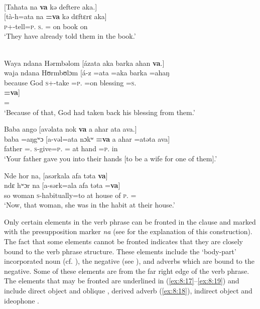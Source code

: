 \ea \label{ex:8:13}\\
{}[Tahata  na \textbf{va}  kə  deftere  aka.]\\
\gll  {}[tà-h=ata    na  \textbf{=va}    kə  dɛftɛrɛ  aka]\\
      \textsc{p}+{\PFV}-tell=\textsc{p}.{\IO}  \textsc{s}.{\DO}  ={\PRF}    on  book  on\\
\glt  ‘They have already told them in the book.’ 
\z


\ea \label{ex:8:14}\\
Waya  ndana  Hərmbəlom  [ázata  aka  {barka  ahan} \textbf{va}.]\\
\gll  waja  ndana  Hʊrmbʊlɔm   [á-z  =ata   =aka   {barka}    {=ahaŋ}\\     
      because    {\DEM}   God             \textsc{s}+{\IFV}-take =\textsc{p}.{\IO} =on   blessing    =\textsc{s}.{\POSS}\\  
      
    \medskip
\gll \textbf{=va}]\\    
     ={\PRF}\\
\glt  ‘Because of that, God had taken back his blessing from them.’
\z

\ea \label{ex:8:15}
Baba  ango  [avəlata  {nok} \textbf{va}  {a  ahar  ata  ava}.]\\
\gll  baba  =aŋgʷɔ  [a-vəl=ata    {nɔkʷ}  \textbf{=va} {a}  {ahar} {=atəta}  {ava}]\\
      father  ={\twoS}.{\POSS}  \textsc{s}-give=\textsc{p}.{\IO}    {\twoS}  ={\PRF}  at  hand  =\textsc{p}.{\POSS}  in\\
\glt  ‘Your father gave you into their hands [to be a wife for one of them].’
\z

\ea \label{ex:8:16}
Nde  hor  na,  [asərkala  {afa  təta}  \textbf{va}]\\
\gll  ndɛ    hʷɔr  na      [a-sərk=ala  {afa}           {təta}     =\textbf{va}]\\
      so    woman  {\PSP}    \textsc{s}-habitually=to   {at house of}  \textsc{p}.{\POSS}   ={\PRF}\\
\glt  ‘Now, that woman, she was in the habit at their house.’ 
\z

Only certain elements in the verb phrase can be fronted in the clause and marked with the presupposition marker \textit{na} (see  for the explanation of this construction). The fact that some elements cannot be fronted indicates that they are closely bound to the verb phrase structure. These elements include the ‘body-part’ incorporated noun (cf. ),  the negative (see ), and adverbs which are bound to the negative. Some of these elements are from the far right edge of the verb phrase. The elements that may be fronted are underlined in (\ref{ex:8:17}--\ref{ex:8:19}) and include direct object and oblique , derived adverb (\ref{ex:8:18}), indirect object and ideophone . 


